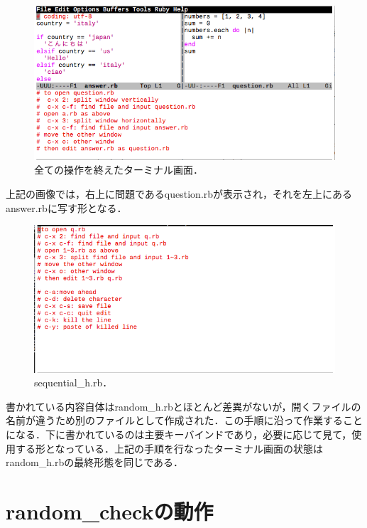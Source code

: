 \begin{figure}[H]
\centering
\begin{center}
\includegraphics[width=150mm]{../../picture/split.png}
\end{center}
\caption{全ての操作を終えたターミナル画面．\label{split}}

\label{fig:}
\end{figure}
上記の画像では，右上に問題であるquestion.rbが表示され，それを左上にあるanswer.rbに写す形となる．

\begin{figure}[H]
\centering
\begin{center}
\includegraphics[width=150mm]{../../picture/sequential_h.png}
\end{center}
\caption{sequential\_h.rb．\label{sqquential}}

\label{fig:}
\end{figure}
書かれている内容自体はrandom\_h.rbとほとんど差異がないが，開くファイルの名前が違うため別のファイルとして作成された．この手順に沿って作業することになる．下に書かれているのは主要キーバインドであり，必要に応じて見て，使用する形となっている．上記の手順を行なったターミナル画面の状態はrandom\_h.rbの最終形態を同じである．

    \section{random\_checkの動作}\label{random_checkux306eux52d5ux4f5c}

